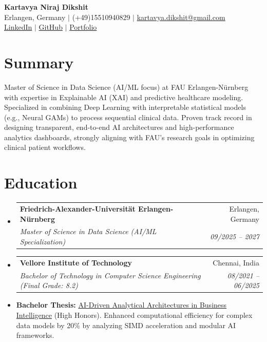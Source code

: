 \documentclass[10pt,a4paper]{article}
\makeatletter
\newcommand{\resumeItem}[1]{\item\small{#1}}
\newcommand{\resumeSubheading}[4]{
  \vspace{-1pt}\item
    \begin{tabular*}{1.0\textwidth}[t]{l@{\extracolsep{\fill}}r}
      \textbf{#1} & #2 \\
      \textit{\small#3} & \textit{\small #4} \\
    \end{tabular*}\vspace{-5pt}
}
\makeatother
\begin{document}
\begin{center}
    \textbf{\huge Kartavya Niraj Dikshit} \\ \vspace{4pt}
    \small Erlangen, Germany $|$ (+49)15510940829 $|$ \href{mailto:kartavya.dikshit@gmail.com}{kartavya.dikshit@gmail.com} \\
    \small \href{https://www.linkedin.com/in/kartavya-dikshit}{LinkedIn} $|$ \href{https://github.com/KartavyaDikshit}{GitHub} $|$ \href{https://kartavyadikshit.github.io/}{Portfolio}
\end{center}

\section{Summary}
Master of Science in Data Science (AI/ML focus) at FAU Erlangen-Nürnberg with expertise in Explainable AI (XAI) and predictive healthcare modeling. Specialized in combining Deep Learning with interpretable statistical models (e.g., Neural GAMs) to process sequential clinical data. Proven track record in designing transparent, end-to-end AI architectures and high-performance analytics dashboards, strongly aligning with FAU's research goals in optimizing clinical patient workflows.

\section{Education}
\begin{itemize}[label={}]
    \resumeSubheading
      {Friedrich-Alexander-Universität Erlangen-Nürnberg}{Erlangen, Germany}
      {Master of Science in Data Science (AI/ML Specialization)}{09/2025 -- 2027}
    \resumeSubheading
      {Vellore Institute of Technology}{Chennai, India}
      {Bachelor of Technology in Computer Science Engineering (Final Grade: 8.2)}{08/2021 -- 06/2025}
      \resumeItem{\textbf{Bachelor Thesis:} \href{https://your-thesis-link.com}{AI-Driven Analytical Architectures in Business Intelligence} (High Honors). Enhanced computational efficiency for complex data models by 20\% by analyzing SIMD acceleration and modular AI frameworks.}
\end{itemize}
\end{document}
